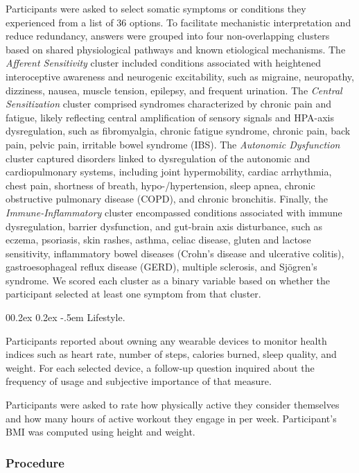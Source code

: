 \documentclass[
  man,
  floatsintext,
  longtable,
  nolmodern,
  notxfonts,
  notimes,
  mask,
  colorlinks=true,linkcolor=blue,citecolor=blue,urlcolor=blue]{apa7}
\makeatletter
\renewcommand{\paragraph}{\@startsection{paragraph}{4}{\parindent}%
	{0\baselineskip \@plus 0.2ex \@minus 0.2ex}%
	{-.5em}%
	{\normalfont\normalsize\bfseries\typesectitle}}
\makeatother
\begin{document}
Participants were asked to select somatic symptoms or conditions they
experienced from a list of 36 options. To facilitate mechanistic
interpretation and reduce redundancy, answers were grouped into four
non-overlapping clusters based on shared physiological pathways and
known etiological mechanisms. The \emph{Afferent Sensitivity} cluster
included conditions associated with heightened interoceptive awareness
and neurogenic excitability, such as migraine, neuropathy, dizziness,
nausea, muscle tension, epilepsy, and frequent urination. The
\emph{Central Sensitization} cluster comprised syndromes characterized
by chronic pain and fatigue, likely reflecting central amplification of
sensory signals and HPA-axis dysregulation, such as fibromyalgia,
chronic fatigue syndrome, chronic pain, back pain, pelvic pain,
irritable bowel syndrome (IBS). The \emph{Autonomic Dysfunction} cluster
captured disorders linked to dysregulation of the autonomic and
cardiopulmonary systems, including joint hypermobility, cardiac
arrhythmia, chest pain, shortness of breath, hypo-/hypertension, sleep
apnea, chronic obstructive pulmonary disease (COPD), and chronic
bronchitis. Finally, the \emph{Immune-Inflammatory} cluster encompassed
conditions associated with immune dysregulation, barrier dysfunction,
and gut-brain axis disturbance, such as eczema, psoriasis, skin rashes,
asthma, celiac disease, gluten and lactose sensitivity, inflammatory
bowel diseases (Crohn's disease and ulcerative colitis),
gastroesophageal reflux disease (GERD), multiple sclerosis, and
Sjögren's syndrome. We scored each cluster as a binary variable based on
whether the participant selected at least one symptom from that cluster.

\paragraph{Lifestyle.}\label{lifestyle}

Participants reported about owning any wearable devices to monitor
health indices such as heart rate, number of steps, calories burned,
sleep quality, and weight. For each selected device, a follow-up
question inquired about the frequency of usage and subjective importance
of that measure.

Participants were asked to rate how physically active they consider
themselves and how many hours of active workout they engage in per week.
Participant's BMI was computed using height and weight.

\subsubsection{Procedure}\label{procedure-1}
\end{document}
